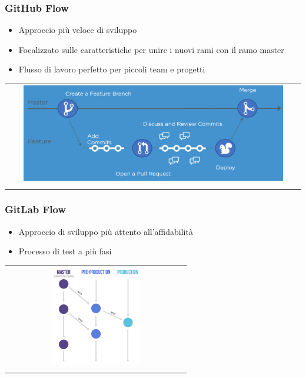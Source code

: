 \subsubsection{GitHub Flow}
\begin{itemize}
    \item Approccio più veloce di sviluppo
    \item Focalizzato sulle caratteristiche per unire i nuovi rami con il ramo master
    \item Flusso di lavoro perfetto per piccoli team e progetti
\end{itemize}
\begin{center}
    \begin{tabular}{c}
        \\ \includegraphics[width=0.9\textwidth]{images/VCS4.png} \\ \\
    \end{tabular}
\end{center}

\subsubsection{GitLab Flow}
\begin{itemize}
    \item Approccio di sviluppo più attento all'affidabilità
    \item Processo di test a più fasi
\end{itemize}
\begin{center}
    \begin{tabular}{c}
        \\ \includegraphics[width=0.5\textwidth]{images/VCS5.png} \\ \\
    \end{tabular}
\end{center}

